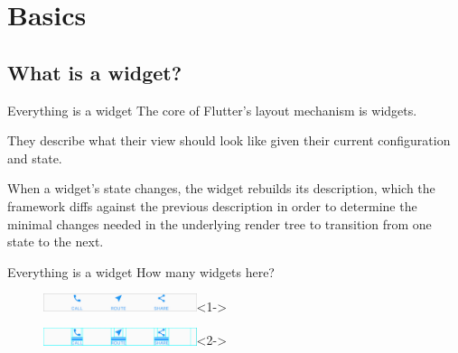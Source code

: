 \section{Basics}

\subsection{What is a widget?}

\begin{frame}{Everything is a widget}
    The core of Flutter's layout mechanism is widgets.

    They describe what their view should look like given their current configuration and state.

    When a widget's state changes, the widget rebuilds its description, which the framework diffs against the previous description in order to determine the minimal changes needed in the underlying render tree to transition from one state to the next.
\end{frame}

\begin{frame}{Everything is a widget}
    How many widgets here?
    \begin{figure}[h]
        \includegraphics[width=0.4\textwidth]{images/lakes-icons.png}<1->
    \end{figure}

    \begin{figure}[h]
        \includegraphics[width=0.4\textwidth]{images/lakes-icons-visual.png}<2->
    \end{figure}

\end{frame}

